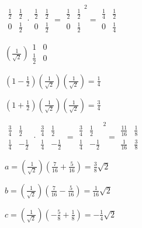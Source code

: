 \documentclass{article}
\begin{document}
$
\begin{array}{cc}
\frac{1}{2} & \frac{1}{2} \\ 
0 & \frac{1}{2}
\end{array}
\cdot 
\begin{array}{cc}
\frac{1}{2} & \frac{1}{2} \\ 
0 & \frac{1}{2}
\end{array}
=\allowbreak 
\begin{array}{cc}
\frac{1}{2} & \frac{1}{2} \\ 
0 & \frac{1}{2}
\end{array}
^{2}=\allowbreak 
\begin{array}{cc}
\frac{1}{4} & \frac{1}{2} \\ 
0 & \frac{1}{4}
\end{array}
$

$(\frac{1}{\sqrt{2}})
\begin{array}{cc}
1 & 0 \\ 
\frac{1}{2} & 0
\end{array}
$

$(1-\frac{1}{2})(\frac{1}{\sqrt{2}})(\frac{1}{\sqrt{2}})=\allowbreak \frac{1%
}{4}$

$(1+\frac{1}{2})(\frac{1}{\sqrt{2}})(\frac{1}{\sqrt{2}})=\allowbreak \frac{3%
}{4}$

$
\begin{array}{cc}
\frac{3}{4} & \frac{1}{2} \\ 
\frac{1}{4} & -\frac{1}{2}
\end{array}
\cdot 
\begin{array}{cc}
\frac{3}{4} & \frac{1}{2} \\ 
\frac{1}{4} & -\frac{1}{2}
\end{array}
=\allowbreak 
\begin{array}{cc}
\frac{3}{4} & \frac{1}{2} \\ 
\frac{1}{4} & -\frac{1}{2}
\end{array}
^{2}=\allowbreak 
\begin{array}{cc}
\frac{11}{16} & \frac{1}{8} \\ 
\frac{1}{16} & \frac{3}{8}
\end{array}
$

$a=(\frac{1}{\sqrt{2}})(\frac{7}{16}+\frac{5}{16})=\allowbreak \frac{3}{8}%
\sqrt{2}$

$b=(\frac{1}{\sqrt{2}})(\frac{7}{16}-\frac{5}{16})=\allowbreak \frac{1}{16}%
\sqrt{2}$

$c=(\frac{1}{\sqrt{2}})(-\frac{5}{8}+\frac{1}{8})=\allowbreak -\frac{1}{4}%
\sqrt{2}$
\end{document}
